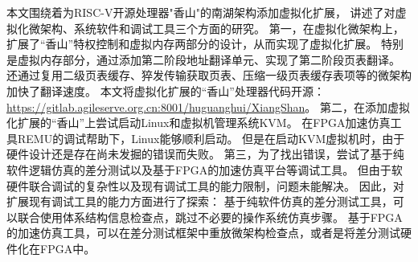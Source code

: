 \begin{conclusions}

本文围绕着为RISC-V开源处理器"香山"的南湖架构添加虚拟化扩展，
讲述了对虚拟化微架构、系统软件和调试工具三个方面的研究。
第一，在虚拟化微架构上，扩展了“香山”特权控制和虚拟内存两部分的设计，从而实现了虚拟化扩展。
特别是虚拟内存部分，通过添加第二阶段地址翻译单元、实现了第二阶段页表翻译。
还通过复用二级页表缓存、猝发传输获取页表、压缩一级页表缓存表项等的微架构加快了翻译速度。
本文将虚拟化扩展的“香山”处理器代码开源：\url{https://gitlab.agileserve.org.cn:8001/huguanghui/XiangShan}。
第二，在添加虚拟化扩展的“香山”上尝试启动Linux和虚拟机管理系统KVM。
在FPGA加速仿真工具REMU的调试帮助下，Linux能够顺利启动。
但是在启动KVM虚拟机时，由于硬件设计还是存在尚未发掘的错误而失败。
第三，为了找出错误，尝试了基于纯软件逻辑仿真的差分测试以及基于FPGA的加速仿真平台等调试工具。
但由于软硬件联合调试的复杂性以及现有调试工具的能力限制，问题未能解决。
因此，对扩展现有调试工具的能力方面进行了探索：
基于纯软件仿真的差分测试工具，可以联合使用体系结构信息检查点，跳过不必要的操作系统仿真步骤。
基于FPGA的加速仿真工具，可以在差分测试框架中重放微架构检查点，或者是将差分测试硬件化在FPGA中。

\end{conclusions}
